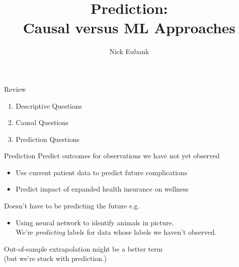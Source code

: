 \documentclass[11pt]{beamer}
\title{Prediction: \\ Causal versus ML Approaches}
\author{\small Nick Eubank}
\date{\vspace*{.3in} \date}
\begin{document}
\begin{frame}
\maketitle
\end{frame}

\begin{frame}[c]{Review}

\begin{enumerate}
  \item Descriptive Questions
  \begin{itemize}
  \end{itemize}
  \item Causal Questions
  \begin{itemize}
  \end{itemize}
  \item \alert<6->{Prediction Questions}
\end{enumerate}
\end{frame}

\begin{frame}[c]{Prediction}
  \pause Predict outcomes for observations we have not yet observed
  \begin{itemize}
    \pause \item Use current patient data to predict future complications
    \pause \item Predict impact of expanded health insurance on wellness
  \end{itemize}
  \pause Doesn't have to be predicting \alert{the future}
  \pause e.g.
  \begin{itemize}
    \item Using neural network to identify animals in picture. \\
    \pause We're \emph{predicting} labels for data whose labels we haven't observed.
  \end{itemize}
  \vspace{0.2cm}
  \pause \alert{Out-of-sample extrapolation} might be a better term \\
  (but we're stuck with prediction.)
\end{frame}
\end{document}
